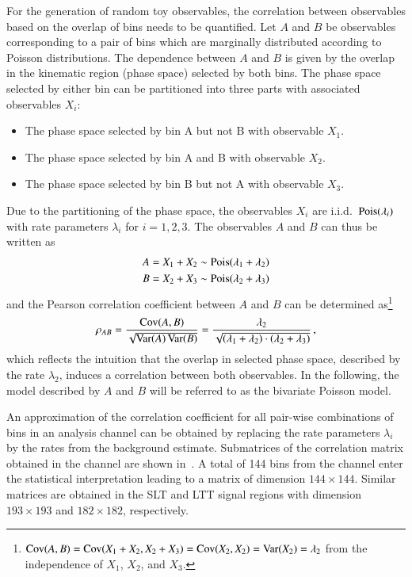 For the generation of random toy observables, the correlation between
observables based on the overlap of bins needs to be quantified. Let
$A$ and $B$ be observables corresponding to a pair of bins which are
marginally distributed according to Poisson distributions. The
dependence between $A$ and $B$ is given by the overlap in the
kinematic region (phase space) selected by both bins. The phase space
selected by either bin can be partitioned into three parts with
associated observables $X_i$:
\begin{itemize}
\item The phase space selected by bin A but not B with observable $X_1$.
\item The phase space selected by bin A and B with observable $X_2$.
\item The phase space selected by bin B but not A with observable $X_3$.
\end{itemize}
Due to the partitioning of the phase space, the observables $X_i$ are
i.i.d.\ $\operatorname{Pois}(\lambda_i)$ with rate parameters $\lambda_i$ for
$i = 1, 2, 3$. The observables $A$ and $B$ can thus be written as
\begin{align*}
  A &= X_1 + X_2 \sim \operatorname{Pois}(\lambda_1 + \lambda_2) \\
  B &= X_2 + X_3 \sim \operatorname{Pois}(\lambda_2 + \lambda_3)
\end{align*}
and the Pearson correlation coefficient between $A$ and $B$ can be
determined
as\footnote{$\operatorname{Cov}(A,B) = \operatorname{Cov}(X_1 + X_2, X_2 + X_3) = \operatorname{Cov}(X_2, X_2) =
  \operatorname{Var}(X_2) = \lambda_2$ from the independence of $X_1$, $X_2$, and
  $X_3$.}
\begin{align*}
  \rho_{AB} = \frac{\operatorname{Cov}(A, B)}{\sqrt{\operatorname{Var}(A)\operatorname{Var}(B)}}
  = \frac{\lambda_2}{\sqrt{(\lambda_1 + \lambda_2) \cdot (\lambda_2 + \lambda_3)}} \,\text{,}
\end{align*}
which reflects the intuition that the overlap in selected phase space,
described by the rate $\lambda_2$, induces a correlation between both
observables. In the following, the model described by $A$ and $B$ will
be referred to as the bivariate Poisson model.

An approximation of the correlation coefficient for all pair-wise
combinations of bins in an analysis channel can be obtained by
replacing the rate parameters $\lambda_i$ by the rates from the
background estimate. Submatrices of the correlation matrix obtained in
the \hadhad channel are shown
in~. A total of 144 bins from
the \hadhad channel enter the statistical interpretation leading to a
matrix of dimension $144 \times 144$. Similar matrices are obtained in
the \lephad SLT and LTT signal regions with dimension $193 \times 193$
and $182 \times 182$, respectively.

